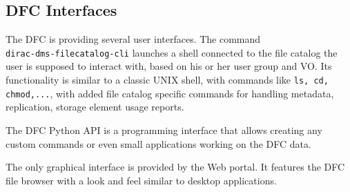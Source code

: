 \subsection{DFC Interfaces}

The DFC is providing several user interfaces. The command \\ \texttt{dirac-dms-filecatalog-cli} launches a shell
connected to the file catalog the user is supposed to interact with, based on his or her user group and VO. Its 
functionality is similar to a classic UNIX shell, with commands like \texttt{ls, cd, chmod,...}, with added 
file catalog specific commands for handling metadata, replication, storage element usage reports.

The DFC Python API is a programming interface that allows creating any custom commands or even
small applications working on the DFC data.

The only graphical interface is provided by the Web portal. It features the DFC file browser
with a look and feel similar to desktop applications. %

